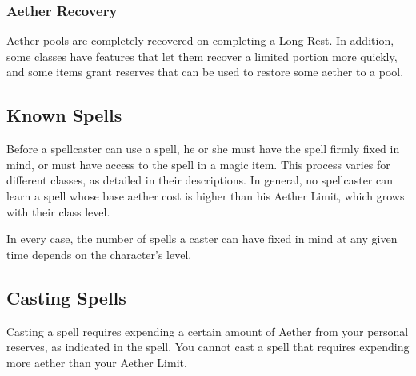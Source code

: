 \subsubsection{Aether Recovery}
Aether pools are completely recovered on completing a Long Rest. In addition, some classes have features that let them recover a limited portion more quickly, and some items grant reserves that can be used to restore some aether to a pool.

\subsection{Known Spells}

Before a spellcaster can use a spell, he or she must have the spell firmly fixed in mind, or must have access to the spell in a magic item. This process varies for different classes, as detailed in their descriptions. In general, no spellcaster can learn a spell whose base aether cost is higher than his Aether Limit, which grows with their class level. 

In every case, the number of spells a caster can have fixed in mind at any given time depends on the character's level.

\subsection{Casting Spells}
Casting a spell requires expending a certain amount of Aether from your personal reserves, as indicated in the spell. You cannot cast a spell that requires expending more aether than your Aether Limit. 

